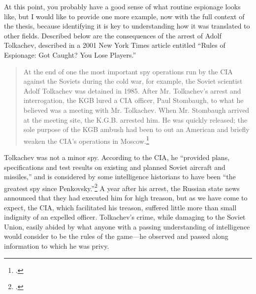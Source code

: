 \documentclass{report}
\begin{document}
At this point, you probably have a good sense of what routine espionage looks like, but I would like to provide one more example, now with the full context of the thesis, because identifying it is key to understanding how it was translated to other fields. Described below are the consequences of the arrest of Adolf Tolkachev, described in a 2001 New York Times article entitled ``Rules of Espionage: Got Caught? You Lose Players.''

\begin{quote}
At the end of one the most important spy operations run by the CIA against the Soviets during the cold war, for example, the Soviet scientist Adolf Tolkachev was detained in 1985. After Mr. Tolkachev's arrest and interrogation, the KGB lured a CIA officer, Paul Stombaugh, to what he believed was a meeting with Mr. Tolkachev. When Mr. Stombaugh arrived at the meeting site, the K.G.B. arrested him. He was quickly released; the sole purpose of the KGB ambush had been to out an American and briefly weaken the CIA's operations in Moscow.\footcite{risen_rules_2001}
\end{quote}
Tolkachev was not a minor spy. According to the CIA, he ``provided plans, specifications and test results on existing and planned Soviet aircraft and missiles,'' and is considered by some intelligence historians to have been ``the greatest spy since Penkovsky.''\footcite{cia_look_2008} A year after his arrest, the Russian state news announced that they had executed him for high treason, but as we have come to expect, the CIA, which facilitated his treason, suffered little more than small indignity of an expelled officer. Tolkachev's crime, while damaging to the Soviet Union, easily abided by what anyone with a passing understanding of intelligence would consider to be the rules of the game---he observed and passed along information to which he was privy.

\end{document}
